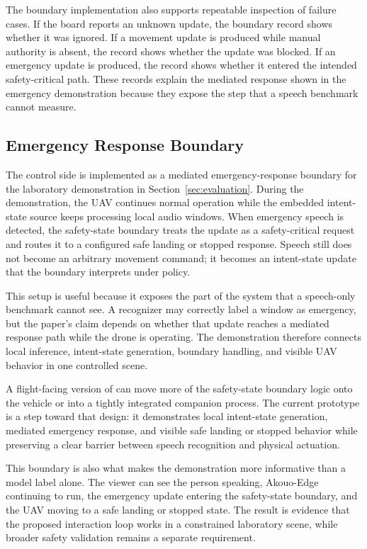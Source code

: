 The boundary implementation also supports repeatable inspection of failure cases. If the board reports an unknown update, the boundary record shows whether it was ignored. If a movement update is produced while manual authority is absent, the record shows whether the update was blocked. If an emergency update is produced, the record shows whether it entered the intended safety-critical path. These records explain the mediated response shown in the emergency demonstration because they expose the step that a speech benchmark cannot measure.

\subsection{Emergency Response Boundary}

The control side is implemented as a mediated emergency-response boundary for the laboratory demonstration in Section~\ref{sec:evaluation}. During the demonstration, the UAV continues normal operation while the embedded intent-state source keeps processing local audio windows. When emergency speech is detected, the safety-state boundary treats the update as a safety-critical request and routes it to a configured safe landing or stopped response. Speech still does not become an arbitrary movement command; it becomes an intent-state update that the boundary interprets under policy.

This setup is useful because it exposes the part of the system that a speech-only benchmark cannot see. A recognizer may correctly label a window as emergency, but the paper's claim depends on whether that update reaches a mediated response path while the drone is operating. The demonstration therefore connects local inference, intent-state generation, boundary handling, and visible UAV behavior in one controlled scene.

A flight-facing version of \sys{} can move more of the safety-state boundary logic onto the vehicle or into a tightly integrated companion process. The current prototype is a step toward that design: it demonstrates local intent-state generation, mediated emergency response, and visible safe landing or stopped behavior while preserving a clear barrier between speech recognition and physical actuation.

This boundary is also what makes the demonstration more informative than a model label alone. The viewer can see the person speaking, Akouo-Edge continuing to run, the emergency update entering the safety-state boundary, and the UAV moving to a safe landing or stopped state. The result is evidence that the proposed interaction loop works in a constrained laboratory scene, while broader safety validation remains a separate requirement.
